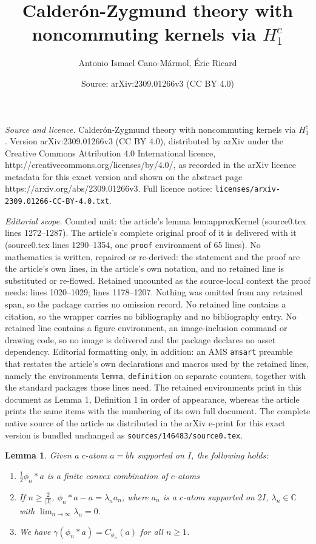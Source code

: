 \documentclass[10pt,a4paper]{amsart}
\title{Calder\'on-Zygmund theory with noncommuting kernels via $H_1^c$}
\author{Antonio Ismael Cano-M\'armol, \'Eric Ricard}
\date{Source: arXiv:2309.01266v3 (CC BY 4.0)}
\newtheorem{lemma}{Lemma}
\newcommand{\C}{\mathbb{C}}
\begin{document}
\maketitle

\noindent\emph{Source and licence.} Calder\'on-Zygmund theory with noncommuting kernels via $H_1^c$. Version arXiv:2309.01266v3 (CC BY 4.0), distributed by arXiv under the Creative Commons Attribution 4.0 International licence, http://creativecommons.org/licenses/by/4.0/, as recorded in the arXiv licence metadata for this exact version and shown on the abstract page https://arxiv.org/abs/2309.01266v3. Full licence notice: \texttt{licenses/arxiv-2309.01266-CC-BY-4.0.txt}.\par\smallskip

\noindent\textit{Editorial scope.} Counted unit: the article's lemma lem:approxKernel (source0.tex lines 1272--1287). The article's complete original proof of it is delivered with it (source0.tex lines 1290--1354, one \texttt{proof} environment of 65 lines). No mathematics is written, repaired or re-derived: the statement and the proof are the article's own lines, in the article's own notation, and no retained line is substituted or re-flowed.  Retained uncounted as the source-local context the proof needs: lines 1020--1029; lines 1178--1207.  Nothing was omitted from any retained span, so the package carries no omission record.  No retained line contains a citation, so the wrapper carries no bibliography and no bibliography entry.  No retained line contains a figure environment, an image-inclusion command or drawing code, so no image is delivered and the package declares no asset dependency.  Editorial formatting only, in addition: an AMS \texttt{amsart} preamble that restates the article's own declarations and macros used by the retained lines, namely the environments \texttt{lemma}, \texttt{definition} on separate counters, together with the standard packages those lines need.  The retained environments print in this document as Lemma 1, Definition 1 in order of appearance, whereas the article prints the same items with the numbering of its own full document.  The complete native source of the article as distributed in the arXiv e-print for this exact version is bundled unchanged as \texttt{sources/146483/source0.tex}.
\begin{lemma}\label{lem:convolutionAtoms}
        Given a $c$-atom $a=bh$ supported on $I$, the following holds:
        \begin{enumerate}
        \item   $\frac 12\phi_n*a$ is a finite convex combination of $c$-atoms
        \item If $n\geq \frac 2{|I|}$, $\phi_n* a - a= \lambda_n a_n$,
          where $a_n$ is a $c$-atom supported on $2I$,  $\lambda_n\in \C$ with
          $\lim_{n\to \infty} \lambda_n=0$.
        \item We have $\gamma(\phi_n*a)=C_{\phi_n}(a)$ for all $n\geq 1$.
                  \end{enumerate}
      \end{lemma}
\end{document}
